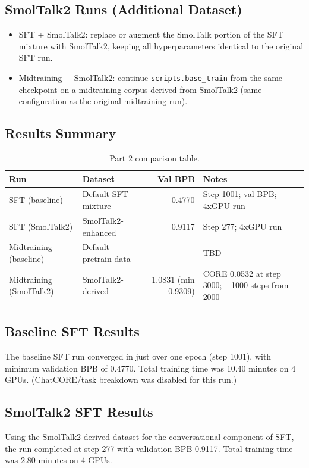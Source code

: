\documentclass[11pt]{article}
\begin{document}
\subsection*{SmolTalk2 Runs (Additional Dataset)}
\begin{itemize}
\item SFT + SmolTalk2: replace or augment the SmolTalk portion of the SFT mixture with SmolTalk2, keeping all hyperparameters identical to the original SFT run.
\item Midtraining + SmolTalk2: continue \texttt{scripts.base\_train} from the same checkpoint on a midtraining corpus derived from SmolTalk2 (same configuration as the original midtraining run).
\end{itemize}

\subsection*{Results Summary}
\begin{table}[h]
\centering
\begin{tabular}{l l r l}
\toprule
\textbf{Run} & \textbf{Dataset} & \textbf{Val BPB} & \textbf{Notes} \\
\midrule
SFT (baseline) & Default SFT mixture & 0.4770 & Step 1001; val BPB; 4xGPU run \\
SFT (SmolTalk2) & SmolTalk2-enhanced & 0.9117 & Step 277; 4xGPU run \\
Midtraining (baseline) & Default pretrain data & -- & TBD \\
Midtraining (SmolTalk2) & SmolTalk2-derived & 1.0831 (min 0.9309) & CORE 0.0532 at step 3000; +1000 steps from 2000 \\
\bottomrule
\end{tabular}
\caption{Part 2 comparison table.}
\end{table}

\subsection*{Baseline SFT Results}
The baseline SFT run converged in just over one epoch (step 1001), with minimum validation BPB of 0.4770. Total training time was 10.40 minutes on 4 GPUs. (ChatCORE/task breakdown was disabled for this run.)

\subsection*{SmolTalk2 SFT Results}
Using the SmolTalk2-derived dataset for the conversational component of SFT, the run completed at step 277 with validation BPB 0.9117. Total training time was 2.80 minutes on 4 GPUs.
\end{document}
